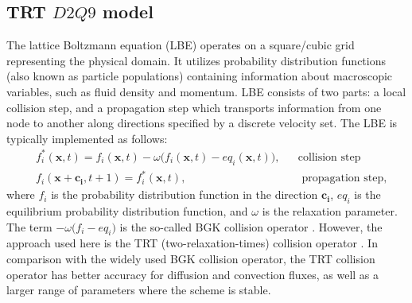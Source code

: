\documentclass[preprint,12pt]{elsarticle}
\begin{document}
\subsection{TRT $D2Q9$ model}
The lattice Boltzmann equation (LBE) operates on a square/cubic grid representing the
physical domain. It utilizes
probability distribution functions (also known as particle populations)
containing information about
macroscopic variables, such as fluid density and momentum. LBE consists of
two parts: a local collision step, and a propagation step which transports
information from one node to another along  
directions specified by a discrete velocity set.
The LBE is typically implemented as follows:
\begin{equation}
\label{standard:implementation}
\begin{aligned}
&f_i^{*}(\bm{x},t)= f_i(\bm{x},t)-\omega \bigl(f_i(\bm{x},t)-eq_i(\bm{x},t)\bigr),&&\text{
collision step}\\
&f_i(\bm{x}+\bm{c_i},t+1)=f_i^{*}(\bm{x},t),&&\text{ propagation step}, 
\end{aligned}
\end{equation}
where $f_i$ is the probability distribution function in the direction $\bm{c_i}$,
 $eq_i$ is the equilibrium probability distribution function, and $\omega$ is the
relaxation parameter. The term $-\omega \bigl(f_i- eq_i\bigr)$ is the so-called BGK
collision operator \cite{bgk}. However, the approach used here is the TRT
(two-relaxation-times) collision operator \cite{ginzburg-main,ginzburg-saturated-flow}. In
comparison with the widely used BGK collision operator, the TRT collision operator has better accuracy
for diffusion and convection fluxes, as well as a larger range of parameters where the scheme is stable.
\end{document}
